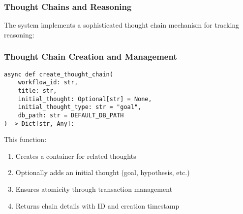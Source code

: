\documentclass[12pt,a4paper]{article}
\begin{document}
\subsubsection*{Thought Chains and Reasoning}

The system implements a sophisticated thought chain mechanism for tracking reasoning:

\subsubsection*{Thought Chain Creation and Management}
\begin{pageablecode}
\begin{verbatim}
async def create_thought_chain(
    workflow_id: str,
    title: str,
    initial_thought: Optional[str] = None,
    initial_thought_type: str = "goal",
    db_path: str = DEFAULT_DB_PATH
) -> Dict[str, Any]:
\end{verbatim}
\end{pageablecode}
This function:
\begin{enumerate}[label=\arabic*.]
    \item Creates a container for related thoughts
    \item Optionally adds an initial thought (goal, hypothesis, etc.)
    \item Ensures atomicity through transaction management
    \item Returns chain details with ID and creation timestamp
\end{enumerate}
\end{document}
